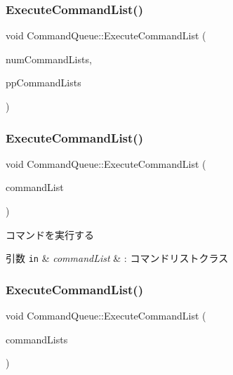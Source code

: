 \subsubsection{\texorpdfstring{Execute\+Command\+List()}{ExecuteCommandList()}\hspace{0.1cm}{\footnotesize\ttfamily [1/3]}}
{\footnotesize\ttfamily void Command\+Queue\+::\+Execute\+Command\+List (\begin{DoxyParamCaption}\item[{U\+I\+NT}]{num\+Command\+Lists,  }\item[{I\+D3\+D12\+Command\+List $\ast$const $\ast$}]{pp\+Command\+Lists }\end{DoxyParamCaption})}

\mbox{\label{class_command_queue_ae6d6d762d71e0ac15ea0d06f2d90f104}} 
\subsubsection{\texorpdfstring{Execute\+Command\+List()}{ExecuteCommandList()}\hspace{0.1cm}{\footnotesize\ttfamily [2/3]}}
{\footnotesize\ttfamily void Command\+Queue\+::\+Execute\+Command\+List (\begin{DoxyParamCaption}\item[{const std\+::shared\+\_\+ptr$<$ \mbox{\hyperlink{class_graphics_command_list}{Graphics\+Command\+List}} $>$}]{command\+List }\end{DoxyParamCaption})}



コマンドを実行する 


\begin{DoxyParams}[1]{引数}
\mbox{\tt in}  & {\em command\+List} & \+: コマンドリストクラス \\
\hline
\end{DoxyParams}
\mbox{\label{class_command_queue_a4eb09588cdee46fb51ab930b37dde17a}} 
\subsubsection{\texorpdfstring{Execute\+Command\+List()}{ExecuteCommandList()}\hspace{0.1cm}{\footnotesize\ttfamily [3/3]}}
{\footnotesize\ttfamily void Command\+Queue\+::\+Execute\+Command\+List (\begin{DoxyParamCaption}\item[{const std\+::vector$<$ std\+::shared\+\_\+ptr$<$ \mbox{\hyperlink{class_graphics_command_list}{Graphics\+Command\+List}} $>$$>$ \&}]{command\+Lists }\end{DoxyParamCaption})}



